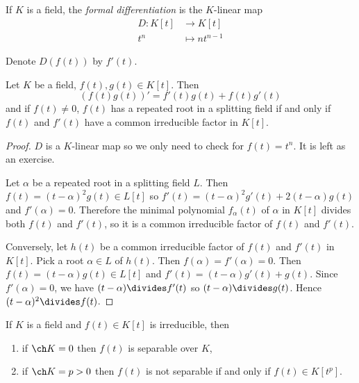 \documentclass[a4paper]{article}
\begin{document}
\begin{definition}
  If \(K\) is a field, the \emph{formal differentiation} is the \(K\)-linear map 
  \begin{align*}
    D: K[t] &\to K[t] \\
    t^n &\mapsto n t^{n-1}
  \end{align*}
\end{definition}

\begin{notation}
  Denote \(D(f(t))\) by \(f'(t)\).
\end{notation}

\begin{lemma}
  \label{lem:formal derivative}
  Let \(K\) be a field, \(f(t), g(t) \in K[t]\). Then
  \[
    (f(t)g(t))' = f'(t)g(t) + f(t)g'(t)
  \]
  and if \(f(t) \neq 0\), \(f(t)\) has a repeated root in a splitting field if and only if \(f(t)\) and \(f'(t)\) have a common irreducible factor in \(K[t]\).
\end{lemma}

\begin{proof}
  \(D\) is a \(K\)-linear map so we only need to check for \(f(t) = t^n\). It is left as an exercise.

  Let \(\alpha\) be a repeated root in a splitting field \(L\). Then \(f(t) = (t - \alpha)^2 g(t) \in L[t]\) so \(f'(t) = (t - \alpha)^2g'(t) + 2(t - \alpha)g(t)\) and \(f'(\alpha) = 0\). Therefore the minimal polynomial \(f_\alpha(t)\) of \(\alpha\) in \(K[t]\) divides both \(f(t)\) and \(f'(t)\), so it is a common irreducible factor of \(f(t)\) and \(f'(t)\).

  Conversely, let \(h(t)\) be a common irreducible factor of \(f(t)\) and \(f'(t)\) in \(K[t]\). Pick a root \(\alpha \in L\) of \(h(t)\). Then \(f(\alpha) = f'(\alpha) = 0\). Then \(f(t) = (t - \alpha)g(t) \in L[t]\) and \(f'(t) = (t - \alpha)g'(t) + g(t)\). Since \(f'(\alpha) = 0\), we have \((t - \alpha) \divides f'(t)\) so \((t -\alpha) \divides g(t)\). Hence \((t - \alpha)^2 \divides f(t)\).
\end{proof}

\begin{corollary}
  If \(K\) is a field and \(f(t) \in K[t]\) is irreducible, then
  \begin{enumerate}
  \item if \(\ch K = 0\) then \(f(t)\) is separable over \(K\),
  \item if \(\ch K = p > 0\) then \(f(t)\) is not separable if and only if \(f(t) \in K[t^p]\).
  \end{enumerate}
\end{corollary}
\end{document}
